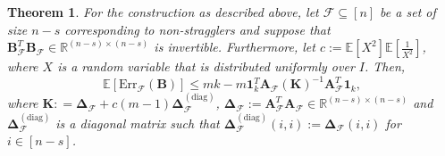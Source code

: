 \documentclass[journal,draftcls,onecolumn]{IEEEtran}
\theoremstyle{mystyle}
\newtheorem{thm}{Theorem}
\newcommand{\bfA}{\mathbf{A}}
\newcommand{\cF}{\mathcal{F}}
\begin{document}
\begin{thm}  
\label{thm:random_diag}
For the construction as described above, let $\mathcal{F} \subseteq [n]$ be a set of size $n-s$ corresponding to non-stragglers and suppose that $\mathbf{B}_{\mathcal{F}}^T\mathbf{B}_{\mathcal{F}}  \in \mathbb{R}^{(n-s) \times (n-s)}$ is invertible. Furthermore, let $c := \mathbb{E}[X^2]\mathbb{E}[\frac{1}{X^2}]$, where $X$ is a random variable that is distributed uniformly  over $I$. Then, %
\begin{equation}
\label{eq:AD1AD2err}
 \mathbb{E}[\text{Err}_{\mathcal{F}}(\mathbf{B})] \le mk - m\mathbf{1}_k^T \bfA_{\cF} \left(\mathbf{K}\right)^{-1} \bfA_{\cF}^T\mathbf{1}_k, 
\end{equation} 
where $\mathbf{K}: = \mathbf{\Delta}_{\mathcal{F}} + c(m-1)\mathbf{\Delta}^{(\text{diag})}_{\mathcal{F}}$, $\mathbf{\Delta}_{\mathcal{F}} := \mathbf{A}_{\mathcal{F}}^T\mathbf{A}_{\mathcal{F}} \in \mathbb{R}^{(n-s) \times (n-s)}$ and  $\mathbf{\Delta}^{(\text{diag})}_{\mathcal{F}}$ is a diagonal matrix such that $\mathbf{\Delta}^{(\text{diag})}_{\mathcal{F}}(i,i) := \mathbf{\Delta}_{\mathcal{F}}(i,i)$ 
for $i \in [n-s]$. 
\end{thm}
\end{document}

